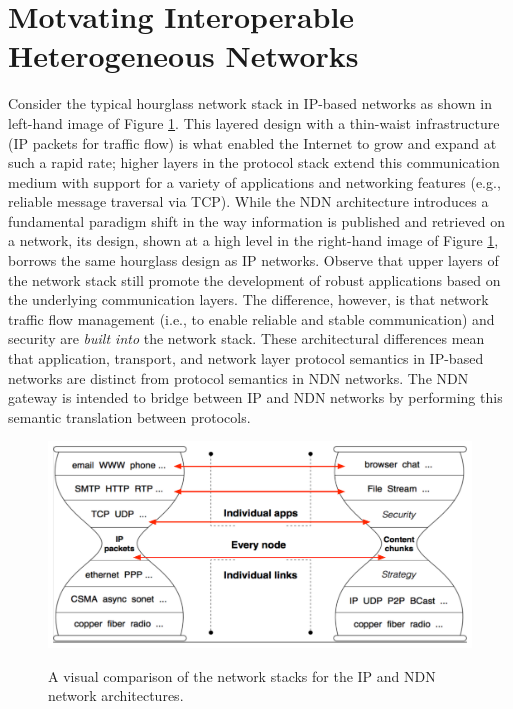 \section{Motvating Interoperable Heterogeneous Networks}
Consider the typical hourglass network stack in IP-based networks as shown in left-hand image of Figure \ref{fig:hourglass}. This layered design with a thin-waist infrastructure (IP packets for traffic flow) is what enabled the Internet to grow and expand at such a rapid rate; higher layers in the protocol stack extend this communication medium with support for a variety of applications and networking features (e.g., reliable message traversal via TCP). While the NDN architecture introduces a fundamental paradigm shift in the way information is published and retrieved on a network, its design, shown at a high level in the right-hand image of Figure \ref{fig:hourglass}, borrows the same hourglass design as IP networks. Observe that upper layers of the network stack still promote the development of robust applications based on the underlying communication layers. The difference, however, is that network traffic flow management (i.e., to enable reliable and stable communication) and security are \emph{built into} the network stack. These architectural differences mean that application, transport, and network layer protocol semantics in IP-based networks are distinct from protocol semantics in NDN networks. The NDN gateway is intended to bridge between IP and NDN networks by performing this semantic translation between protocols. 

\begin{figure}[ht!]
\begin{center}
\includegraphics[scale=0.32]{./images/hourglass_conn.pdf}
\label{fig:hourglass}
\caption{A visual comparison of the network stacks for the IP and NDN network architectures.}
\end{center}
\end{figure}

